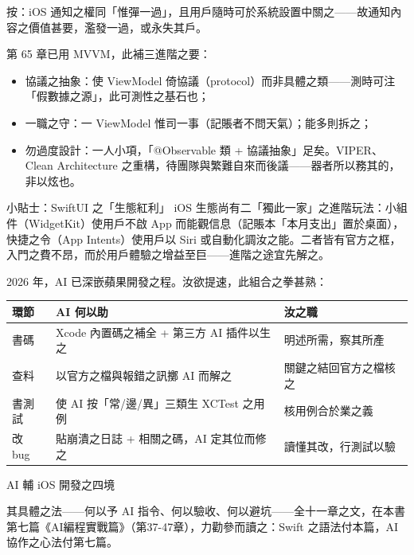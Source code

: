 按：iOS 通知之權同「惟彈一過」，且用戶隨時可於系統設置中關之——故通知內容之價值甚要，濫發一過，或永失其戶。


第 65 章已用 MVVM，此補三進階之要：

\begin{itemize}
  \item 協議之抽象：使 ViewModel 倚協議（protocol）而非具體之類——測時可注「假數據之源」，此可測性之基石也；
  \item 一職之守：一 ViewModel 惟司一事（記賬者不問天氣）；能多則拆之；
  \item 勿過度設計：一人小項，「@Observable 類 + 協議抽象」足矣。VIPER、Clean Architecture 之重構，待團隊與繁難自來而後議——器者所以務其的，非以炫也。
\end{itemize}

\begin{tcbinfo}{小貼士：SwiftUI 之「生態紅利」}
iOS 生態尚有二「獨此一家」之進階玩法：小組件（WidgetKit）使用戶不啟 App 而能觀信息（記賬本「本月支出」置於桌面），快捷之令（App Intents）使用戶以 Siri 或自動化調汝之能。二者皆有官方之框，入門之費不昂，而於用戶體驗之增益至巨——進階之途宜先解之。

\end{tcbinfo}


2026 年，AI 已深嵌蘋果開發之程。汝欲提速，此組合之拳甚熟：

\begin{center}
\begin{tabularx}{\linewidth}{|X|X|X|}
\hline
\textbf{環節} & \textbf{AI 何以助} & \textbf{汝之職} \tabularnewline
\hline
書碼 & Xcode 內置碼之補全 + 第三方 AI 插件以生之 & 明述所需，察其所產 \tabularnewline
查料 & 以官方之檔與報錯之訊擲 AI 而解之 & 關鍵之結回官方之檔核之 \tabularnewline
書測試 & 使 AI 按「常/邊/異」三類生 XCTest 之用例 & 核用例合於業之義 \tabularnewline
改 bug & 貼崩潰之日誌 + 相關之碼，AI 定其位而修之 & 讀懂其改，行測試以驗 \tabularnewline
\hline
\end{tabularx}
\end{center}

\begin{center}\small\color{gray}AI 輔 iOS 開發之四境\end{center}

其具體之法——何以予 AI 指令、何以驗收、何以避坑——全十一章之文，在本書第七篇《AI編程實戰篇》（第37-47章），力勸參而讀之：Swift 之語法付本篇，AI 協作之心法付第七篇。

